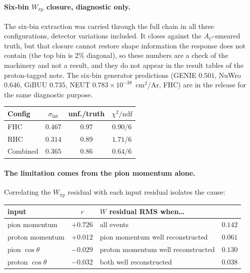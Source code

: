\documentclass[11pt,a4paper]{article}
\begin{document}
\paragraph{Six-bin $W_{\pi p}$ closure, diagnostic only.} The six-bin extraction was
carried through the full chain in all three configurations, detector variations included.
It closes against the $A_C$-smeared truth, but that closure cannot restore shape
information the response does not contain (the top bin is $2\%$ diagonal), so these numbers
are a check of the machinery and not a result, and they do not appear in the result tables of the
proton-tagged note. The six-bin generator predictions (GENIE $0.501$, NuWro $0.646$,
GiBUU $0.735$, NEUT $0.783\times10^{-38}$~cm$^2$/Ar, FHC) are in the release for the same
diagnostic purpose.

\begin{center}\small
{}
\label{tab:wpipr_sixbin_closure}
\begin{tabular}{lccc}
\toprule
Config & $\sigma_\mathrm{int}$ & unf./truth & $\chi^2/\mathrm{ndf}$ \\
\midrule
FHC      & $0.467$ & $0.97$ & $0.90/6$ \\
RHC      & $0.314$ & $0.89$ & $1.71/6$ \\
Combined & $0.365$ & $0.86$ & $0.64/6$ \\
\bottomrule
\end{tabular}
\end{center}

\paragraph{The limitation comes from the pion momentum alone.} Correlating the $W_{\pi p}$
residual with each input residual isolates the cause:

\begin{center}\small
\begin{tabular}{lc|lc}
\toprule
input & $r$ & $W$ residual RMS when\ldots & \\\midrule
pion momentum   & $\mathbf{+0.726}$ & all events                 & $0.142$ \\
proton momentum & $+0.012$ & pion momentum well reconstructed    & $\mathbf{0.061}$ \\
pion $\cos\theta$   & $-0.029$ & proton momentum well reconstructed  & $0.130$ \\
proton $\cos\theta$ & $-0.032$ & both well reconstructed             & $0.038$ \\
\bottomrule
\end{tabular}
\end{center}
\end{document}
